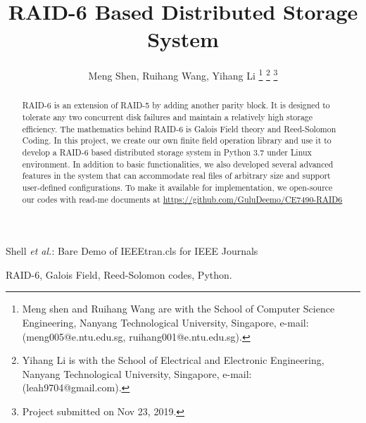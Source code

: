 \documentclass[journal]{IEEEtran}
\begin{document}
\title{RAID-6 Based Distributed Storage System}

\author{Meng Shen,
        Ruihang Wang,
        Yihang Li %
\thanks{Meng shen and Ruihang Wang are with the School
of Computer Science Engineering, Nanyang Technological University, Singapore,
e-mail: (meng005@e.ntu.edu.sg, ruihang001@e.ntu.edu.sg).}%
\thanks{Yihang Li is with the School
of Electrical and Electronic Engineering, Nanyang Technological University, Singapore,
e-mail: (leah9704@gmail.com).}%
\thanks{Project submitted on Nov 23, 2019.}}

%
{Shell \MakeLowercase{\textit{et al.}}: Bare Demo of IEEEtran.cls for IEEE Journals}

\maketitle

\begin{abstract}
RAID-6 is an extension of RAID-5 by adding another parity block. It is designed to tolerate any two concurrent disk failures and maintain a relatively high storage efficiency. The mathematics behind RAID-6 is Galois Field theory and Reed-Solomon Coding. In this project, we create our own finite field operation library and use it to develop a RAID-6 based distributed storage system in Python 3.7 under Linux environment. In addition to basic functionalities, we also developed several advanced features in the system that can accommodate real files of arbitrary size and support user-defined configurations. To make it available for implementation, we open-source our codes with read-me documents at \url{https://github.com/GuluDeemo/CE7490-RAID6}
\end{abstract}

\begin{IEEEkeywords}
RAID-6, Galois Field, Reed-Solomon codes, Python. 
\end{IEEEkeywords}
\end{document}

